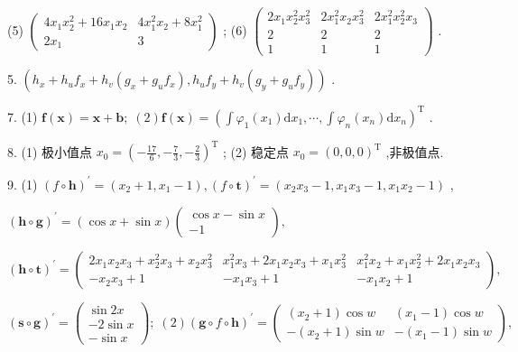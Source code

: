 (5) \(\left( \begin{matrix} 4{x}_{1}{x}_{2}^{2} + {16}{x}_{1}{x}_{2} & 4{x}_{1}^{2}{x}_{2} + 8{x}_{1}^{2} \\  2{x}_{1} & 3 \end{matrix}\right)\) ; (6) \(\left( \begin{matrix} 2{x}_{1}{x}_{2}^{2}{x}_{3}^{2} & 2{x}_{1}^{2}{x}_{2}{x}_{3}^{2} & 2{x}_{1}^{2}{x}_{2}^{2}{x}_{3} \\  2 & 2 & 2 \\  1 & 1 & 1 \end{matrix}\right)\) .

5. \(\left( {{h}_{x} + {h}_{u}{f}_{x} + {h}_{v}\left( {{g}_{x} + {g}_{u}{f}_{x}}\right) ,{h}_{u}{f}_{y} + {h}_{v}\left( {{g}_{y} + {g}_{u}{f}_{y}}\right) }\right)\) .

7. (1) \(\mathbf{f}\left( \mathbf{x}\right)  = \mathbf{x} + \mathbf{b};\;\left( 2\right) \mathbf{f}\left( \mathbf{x}\right)  = {\left( \int {\varphi }_{1}\left( {x}_{1}\right) \mathrm{d}{x}_{1},\cdots ,\int {\varphi }_{n}\left( {x}_{n}\right) \mathrm{d}{x}_{n}\right) }^{\mathrm{T}}\) .

8. (1) 极小值点 \({x}_{0} = {\left( -\frac{17}{6}, - \frac{7}{3}, - \frac{2}{3}\right) }^{\mathrm{T}}\) ; (2) 稳定点 \({x}_{0} = {\left( 0,0,0\right) }^{\mathrm{T}}\) ,非极值点.

9. (1) \({\left( f \circ  \mathbf{h}\right) }^{\prime } = \left( {{x}_{2} + 1,{x}_{1} - 1}\right) ,{\left( f \circ  \mathbf{t}\right) }^{\prime } = \left( {{x}_{2}{x}_{3} - 1,{x}_{1}{x}_{3} - 1,{x}_{1}{x}_{2} - 1}\right)\) ,

\({\left( \mathbf{h} \circ  \mathbf{g}\right) }^{\prime } = \left( {\cos x + \sin x}\right) \left( \begin{matrix} \cos x - \sin x \\   - 1 \end{matrix}\right) ,\)

\({\left( \mathbf{h} \circ  \mathbf{t}\right) }^{\prime } = \left( \begin{matrix} 2{x}_{1}{x}_{2}{x}_{3} + {x}_{2}^{2}{x}_{3} + {x}_{2}{x}_{3}^{2} & {x}_{1}^{2}{x}_{3} + 2{x}_{1}{x}_{2}{x}_{3} + {x}_{1}{x}_{3}^{2} & {x}_{1}^{2}{x}_{2} + {x}_{1}{x}_{2}^{2} + 2{x}_{1}{x}_{2}{x}_{3} \\   - {x}_{2}{x}_{3} + 1 &  - {x}_{1}{x}_{3} + 1 &  - {x}_{1}{x}_{2} + 1 \end{matrix}\right) ,\)

\({\left( \mathbf{s} \circ  \mathbf{g}\right) }^{\prime } = \left( \begin{matrix} \sin {2x} \\   - 2\sin x \\   - \sin x \end{matrix}\right) ;\;\left( 2\right) {\left( \mathbf{g} \circ  f \circ  \mathbf{h}\right) }^{\prime } = \left( \begin{matrix} \left( {{x}_{2} + 1}\right) \cos w & \left( {{x}_{1} - 1}\right) \cos w \\   - \left( {{x}_{2} + 1}\right) \sin w &  - \left( {{x}_{1} - 1}\right) \sin w \end{matrix}\right) ,\)

